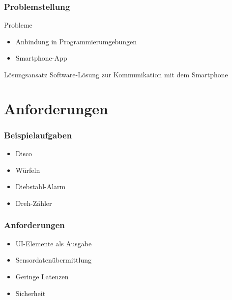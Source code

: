 \documentclass{beamer}
\begin{document}
\begin{frame}
    \frametitle{Problemstellung}
    \begin{alertblock}{Probleme}
        \begin{itemize}
            \item Anbindung in Programmierumgebungen
            \item Smartphone-App
        \end{itemize}
    \end{alertblock}
    \begin{block}{Lösungsansatz}
        Software-Lösung zur Kommunikation mit dem Smartphone
    \end{block}
\end{frame}

\section{Anforderungen}

\begin{frame}
    \frametitle{Beispielaufgaben}
    \begin{itemize}
        \item Disco
        \item Würfeln
        \item Diebstahl-Alarm
        \item Dreh-Zähler
    \end{itemize}
\end{frame}

\begin{frame}
    \frametitle{Anforderungen}
    \begin{itemize}
        \item UI-Elemente als Ausgabe
        \item Sensordatenübermittlung
        \item Geringe Latenzen
        \item Sicherheit
    \end{itemize}
\end{frame}
\end{document}
